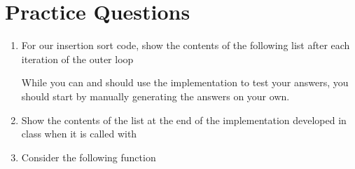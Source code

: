 \documentclass[letterpaper,10pt,english]{sphinxmanual}
\begin{document}
\section{Practice Questions}
\label{\detokenize{lecture_notes/lec21_sorting:practice-questions}}\begin{enumerate}
\item {} 
For our insertion sort code, show the contents of the following list
after each iteration of the outer  loop

%
\begin{sphinxVerbatim}[commandchars=\\\{\}]
  \PYG{p}{[}        \PYG{p}{]}
\end{sphinxVerbatim}

While you can and should use the implementation to test your answers,
you should start by manually generating the answers on your own.

\item {} 
Show the contents of the  list at the end of the
 implementation developed in class when it is called
with

%
\begin{sphinxVerbatim}[commandchars=\\\{\}]
  \PYG{p}{[}         \PYG{p}{]}
\end{sphinxVerbatim}

\item {} 
Consider the following function

%
\begin{sphinxVerbatim}[commandchars=\\\{\}]
    
      \PYG{p}{[}\PYG{p}{]}
       
         \PYG{p}{[}\PYG{p}{]}
              \PYG{p}{[}\PYG{p}{]}
     
\end{sphinxVerbatim}


\end{enumerate}
\end{document}
